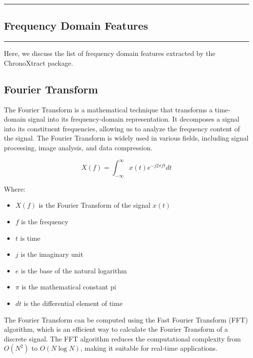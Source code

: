{\color{gray}\hrule}
\begin{center}
\section{Frequency Domain Features}
\bigskip
\end{center}
{\color{gray}\hrule}
Here, we discuss the list of frequency domain features extracted by the ChronoXtract package. 
\subsection{Fourier Transform}
The Fourier Transform is a mathematical technique that transforms a time-domain signal into its frequency-domain representation. It decomposes a signal into its constituent frequencies, allowing us to analyze the frequency content of the signal. 
The Fourier Transform is widely used in various fields, including signal processing, image analysis, and data compression.

\begin{equation}
X(f) = \int_{-\infty}^{\infty} x(t) e^{-j2\pi ft} dt
\end{equation}

Where:
\begin{itemize}
    \item \(X(f)\) is the Fourier Transform of the signal \(x(t)\)
    \item \(f\) is the frequency
    \item \(t\) is time
    \item \(j\) is the imaginary unit
    \item \(e\) is the base of the natural logarithm
    \item \(\pi\) is the mathematical constant pi
    \item \(dt\) is the differential element of time
\end{itemize}
The Fourier Transform can be computed using the Fast Fourier Transform (FFT) algorithm, which is an efficient way to calculate the Fourier Transform of a discrete signal. The FFT algorithm reduces the computational complexity from \(O(N^2)\) to \(O(N \log N)\), making it suitable for real-time applications.

